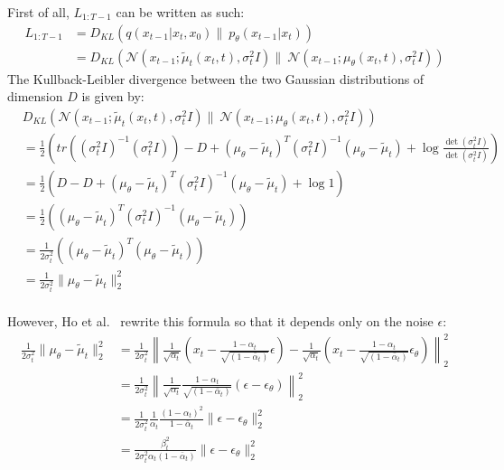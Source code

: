 \documentclass[twoside]{article}
\numberwithin{equation}{section}
\numberwithin{figure}{section}
\begin{document}
First of all, $L_{1: T-1}$ can be written as such:
\begin{align}
  L_{1:T-1} &= D_{KL}\left(q\left(x_{t-1} | x_t, x_0\right) \| \: p_{\theta}\left(x_{t-1} | x_t\right)\right) \\
  &= D_{KL}\left(\mathcal{N} (x_{t-1}; \tilde{\mu}_t \left(x_t, t \right), \sigma^2_t I ) \| \: \mathcal{N} \left( x_{t-1} ; \mu_{\theta}(x_t, t), \sigma^2_t I  \right) \right)
\end{align}
{
  \allowdisplaybreaks
The Kullback-Leibler divergence between the two Gaussian distributions of dimension $D$ is given by:
  \begin{align}
    & D_{KL}\left(\mathcal{N} (x_{t-1}; \tilde{\mu}_t \left(x_t, t \right), \sigma^2_t I ) \| \: \mathcal{N} \left( x_{t-1} ; \mu_{\theta}(x_t, t), \sigma^2_t I  \right) \right) \\
    &= \frac{1}{2} \left( tr\left( (\sigma^2_t I)^{-1} (\sigma^2_t I) \right) - D + \left( \mu_{\theta} - \tilde{\mu}_t \right)^T (\sigma^2_t I)^{-1} \left( \mu_{\theta} - \tilde{\mu}_t \right) + \log \frac{\det(\sigma^2_t I)}{\det(\sigma^2_t I)} \right) \\
    &= \frac{1}{2} \left( D - D + \left( \mu_{\theta} - \tilde{\mu}_t \right)^T (\sigma^2_t I)^{-1} \left( \mu_{\theta} - \tilde{\mu}_t \right) + \log 1 \right) \\
    &= \frac{1}{2} \left( \left( \mu_{\theta} - \tilde{\mu}_t \right)^T (\sigma^2_t I)^{-1} \left( \mu_{\theta} - \tilde{\mu}_t \right) \right) \\
    &= \frac{1}{2 \sigma^2_t} \left( \left( \mu_{\theta} - \tilde{\mu}_t \right)^T \left( \mu_{\theta} - \tilde{\mu}_t \right) \right) \\
    &= \frac{1}{2 \sigma^2_t} \| \mu_{\theta} - \tilde{\mu}_t \|_2^2
  \end{align}
  \\
  However, Ho et al.~\cite{ho2020denoising} rewrite this formula so that it depends only on the noise $\epsilon$:
  \begin{align}
    \frac{1}{2 \sigma^2_t} \| \mu_{\theta} - \tilde{\mu}_t \|_2^2 &= \frac{1}{2 \sigma^2_t} \left\| \frac{1}{\sqrt{\alpha_t}} \left( x_t - \frac{1 - \alpha_t}{\sqrt{(1 - \bar{\alpha}_t)}} \epsilon \right) - \frac{1}{\sqrt{\alpha_t}} \left( x_t - \frac{1 - \alpha_t}{\sqrt{(1 - \bar{\alpha}_t)}} \epsilon_\theta \right)\right\|_2^2 \\
    &= \frac{1}{2 \sigma^2_t} \left\| \frac{1}{\sqrt{\alpha_t}} \frac{1 - \alpha_t}{\sqrt{(1 - \bar{\alpha}_t)}} (\epsilon - \epsilon_\theta) \right\|_2^2 \\
    &= \frac{1}{2 \sigma^2_t} \frac{1}{\alpha_t} \frac{(1 - \alpha_t)^2}{1 - \bar{\alpha}_t} \| \epsilon - \epsilon_\theta \|_2^2 \\
    &= \frac{\beta_t^2}{2 \sigma^2_t \alpha_t (1 - \bar{\alpha}_t)} \| \epsilon - \epsilon_\theta \|_2^2
  \end{align}
}
\end{document}
